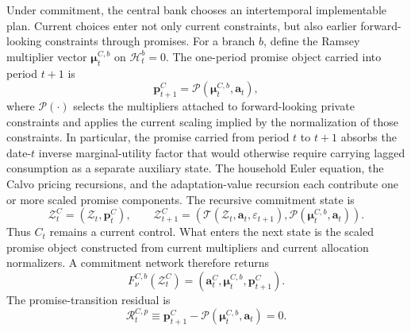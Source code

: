 ﻿\documentclass[12pt]{article}
\theoremstyle{remark}
\begin{document}
Under commitment, the central bank chooses an intertemporal implementable plan. Current choices
enter not only current constraints, but also earlier forward-looking constraints through promises.
For a branch $b$, define the Ramsey multiplier vector $\boldsymbol\mu_t^{C,b}$ on
$\mathcal H_t^b=0$. The one-period promise object carried into period $t+1$ is
\begin{equation}
    \mathbf p_{t+1}^C
    =
    \mathcal P(\boldsymbol\mu_t^{C,b},\mathbf a_t),
    \label{eq:app_commitment_promise_map}
\end{equation}
where $\mathcal P(\cdot)$ selects the multipliers attached to forward-looking private constraints
and applies the current scaling implied by the normalization of those constraints. In particular,
the promise carried from period $t$ to $t+1$ absorbs the date-$t$ inverse marginal-utility factor
that would otherwise require carrying lagged consumption as a separate auxiliary state. The
household Euler equation, the Calvo pricing recursions, and the adaptation-value recursion each
contribute one or more scaled promise components.
The recursive commitment state is
\begin{equation}
    \mathcal Z_t^C
    =
    (\mathcal Z_t,\mathbf p_t^C),
    \qquad
    \mathcal Z_{t+1}^C
    =
    \left(
        \mathcal T(\mathcal Z_t,\mathbf a_t,\varepsilon_{t+1}),
        \mathcal P(\boldsymbol\mu_t^{C,b},\mathbf a_t)
    \right).
    \label{eq:app_deqn_promise_transition}
\end{equation}
Thus $C_t$ remains a current control. What enters the next state is the scaled promise object
constructed from current multipliers and current allocation normalizers.
A commitment network therefore returns
\begin{equation}
    F_\nu^{C,b}(\mathcal Z_t^C)
    =
    \left(
        \mathbf a_t^C,
        \boldsymbol\mu_t^{C,b},
        \mathbf p_{t+1}^C
    \right).
    \label{eq:app_commitment_network_output}
\end{equation}
The promise-transition residual is
\begin{equation}
    \mathcal R_t^{C,p}
    \equiv
    \mathbf p_{t+1}^C
    -
    \mathcal P(\boldsymbol\mu_t^{C,b},\mathbf a_t)
    =
    0.
    \label{eq:app_commitment_promise_residual}
\end{equation}
\end{document}
